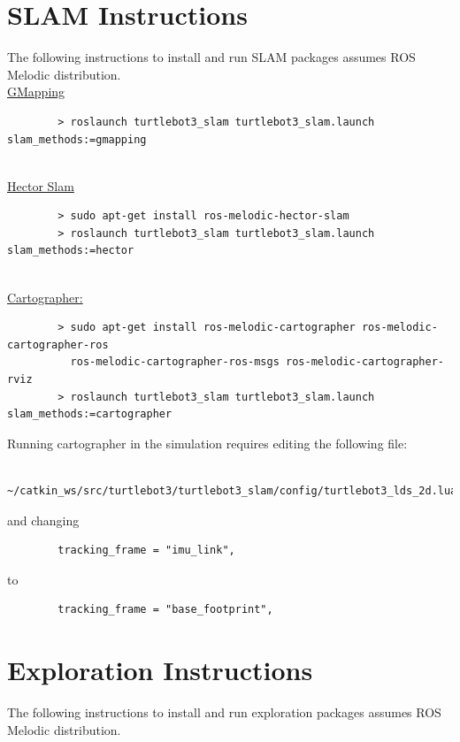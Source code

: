 \documentclass[11pt, a4, nocenter, margin=150mm]{article}
\begin{document}
\begin{appendices}

\section{SLAM Instructions}
\label{app:slam_instructions}

	The following instructions to install and run SLAM packages assumes ROS Melodic distribution.
	~\\

	\underline{GMapping}
	\begin{verbatim}
		> roslaunch turtlebot3_slam turtlebot3_slam.launch slam_methods:=gmapping
	\end{verbatim}
	~\\

	\underline{Hector Slam}
	\begin{verbatim}
		> sudo apt-get install ros-melodic-hector-slam
		> roslaunch turtlebot3_slam turtlebot3_slam.launch slam_methods:=hector
	\end{verbatim}
	~\\

	\underline{Cartographer:}
	\begin{verbatim}
		> sudo apt-get install ros-melodic-cartographer ros-melodic-cartographer-ros
		  ros-melodic-cartographer-ros-msgs ros-melodic-cartographer-rviz
		> roslaunch turtlebot3_slam turtlebot3_slam.launch slam_methods:=cartographer
	\end{verbatim}

	Running cartographer in the simulation requires editing the following file:
	\begin{verbatim}
		~/catkin_ws/src/turtlebot3/turtlebot3_slam/config/turtlebot3_lds_2d.lua
	\end{verbatim}

	and changing
	\begin{verbatim}
		tracking_frame = "imu_link",
	\end{verbatim}

	to
	\begin{verbatim}
		tracking_frame = "base_footprint",
	\end{verbatim}

\section{Exploration Instructions}
\label{app:explore_instructions}

	The following instructions to install and run exploration packages assumes ROS Melodic distribution.
	~\\


\end{appendices}
\end{document}
